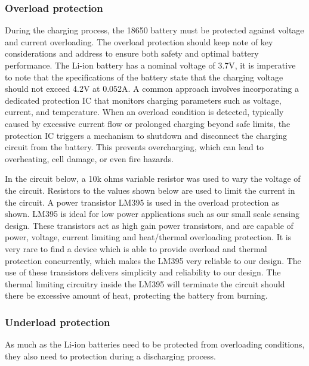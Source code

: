 \documentclass[class=report,11pt,crop=false]{standalone}
\begin{document}
	\subsubsection{Overload protection}
	\vspace{0.5cm}
	During the charging process, the 18650 battery must be protected against voltage and current overloading. The overload protection should keep note of key considerations and address to ensure both safety and optimal battery performance. The Li-ion battery has a nominal voltage of 3.7V, it is imperative to note that the specifications of the battery state that the charging voltage should not exceed 4.2V at 0.052A. A common approach involves incorporating a dedicated protection IC that monitors charging parameters such as voltage, current, and temperature. When an overload condition is detected, typically caused by excessive current flow or prolonged charging beyond safe limits, the protection IC triggers a mechanism to shutdown and disconnect the charging circuit from the battery. This prevents overcharging, which can lead to overheating, cell damage, or even fire hazards.
	
	In the circuit below, a 10k ohms variable resistor was used to vary the voltage of the circuit. Resistors to the values shown below are used to limit the current in the circuit. A power transistor LM395 is used in the overload protection as shown. LM395 is ideal for low power applications such as our small scale sensing design. These transistors act as high gain power transistors, and are capable of power, voltage, current limiting and heat/thermal overloading protection. It is very rare to find a device which is able to provide overload and thermal protection concurrently, which makes the LM395 very reliable to our design. The use of these transistors delivers simplicity and reliability to our design. The thermal limiting circuitry inside the LM395 will terminate the circuit should there be excessive amount of heat, protecting the battery from burning. 
	
	
	\subsubsection{Underload protection}
	\vspace{0.5cm}
	As much as the Li-ion batteries need to be protected from overloading conditions, they also need to protection during a discharging process. 
	
\end{document}
